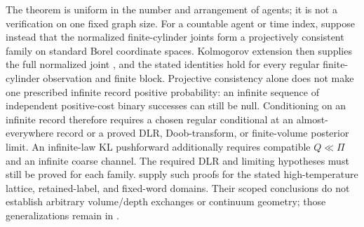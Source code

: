 The theorem is uniform in the number and arrangement of agents; it is not a
verification on one fixed graph size.  For a countable agent or time index,
suppose instead that the normalized finite-cylinder joints form a projectively
consistent family on standard Borel coordinate spaces.  Kolmogorov extension
then supplies the full normalized joint \citep{Kallenberg2021}, and the stated
identities hold for every regular finite-cylinder observation and finite block.
Projective consistency alone does not make one prescribed infinite record
positive probability: an infinite sequence of independent positive-cost
binary successes can still be null.  Conditioning on an infinite record
therefore requires a chosen regular conditional at an almost-everywhere record
or a proved DLR, Doob-transform, or finite-volume posterior limit.  An
infinite-law KL pushforward additionally requires compatible
$Q\ll\Pi$ and an infinite coarse channel.  The required DLR and limiting hypotheses must still be proved for each
family.  supply such
proofs for the stated high-temperature lattice, retained-label, and
fixed-word domains. Their scoped conclusions do not establish arbitrary
volume/depth exchanges or continuum geometry; those generalizations remain
in .  
